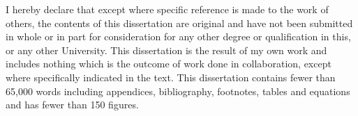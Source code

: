 
\begin{declaration}

I hereby declare that except where specific reference is made to the work of others, the contents of this dissertation are original and have not been submitted in whole or in part for consideration for any other degree or qualification in this, or any other University. This dissertation is the result of my own work and includes nothing which is the outcome of work done in collaboration, except where specifically indicated in the text. This dissertation contains fewer than 65,000 words including appendices, bibliography, footnotes, tables and equations and has fewer than 150 figures.


\end{declaration}

